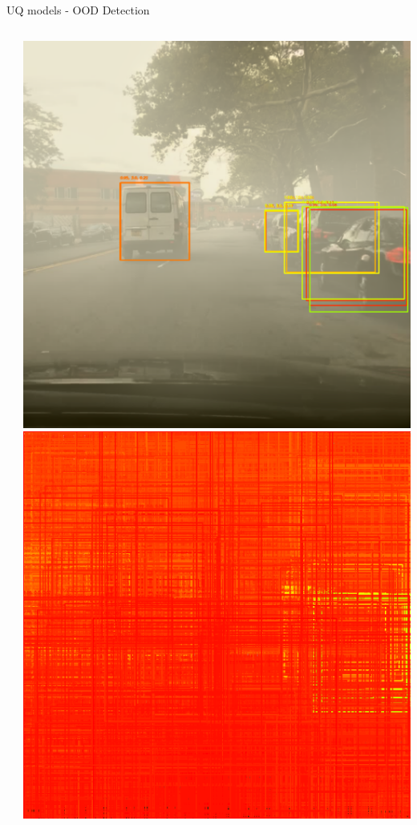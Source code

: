\documentclass[10pt, aspectratio=169]{beamer}
\begin{document}
\begin{frame}[allowframebreaks]{UQ models - OOD Detection}
\begin{columns}
\begin{column}{.2\textwidth}
            \end{column}
            \begin{column}{.2\textwidth}
                \includegraphics[width=\textwidth]{images/uq_weathers/BNN_variances3.png}
                \includegraphics[width=\textwidth]{images/uq_weathers/flipout_entropies_all3.png}

\end{column}
\end{columns}
\end{frame}
\end{document}
